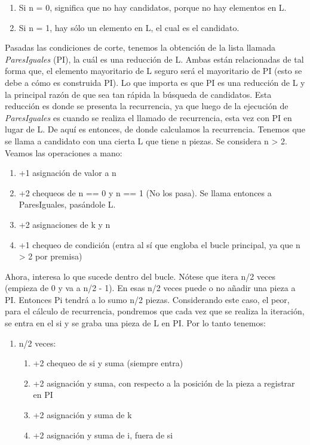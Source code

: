 \documentclass{article}
\begin{document}
\begin{enumerate}
    \item Si n = 0, significa que no hay candidatos, porque no hay elementos en L.
    \item Si n = 1, hay sólo un elemento en L, el cual es el candidato.
\end{enumerate}

Pasadas las condiciones de corte, tenemos la obtención de la lista llamada \textit{ParesIguales} (PI), 
la cuál es una reducción de L. Ambas están relacionadas de tal forma que, 
el elemento mayoritario de L seguro será el mayoritario de PI (esto se debe a cómo es construida PI). 
Lo que importa es que PI es una reducción de L y la principal razón de que sea tan rápida la 
búsqueda de candidatos.
Esta reducción es donde se presenta la recurrencia, ya que luego de la ejecución de \textit{ParesIguales} 
es cuando se realiza el llamado de recurrencia, esta vez con PI en lugar de L. 
De aquí es entonces, de donde calculamos la recurrencia.
Tenemos que se llama a candidato con una cierta L que tiene n piezas. Se considera n > 2. 
Veamos las operaciones a mano:

\begin{enumerate}
    \item +1 asignación de valor a n
    \item +2 chequeos de n == 0 y n == 1 (No los pasa). Se llama entonces a ParesIguales, pasándole L.
    \item +2 asignaciones de k y n
    \item +1 chequeo de condición (entra al sí que engloba el bucle principal, ya que n > 2 por premisa)    
\end{enumerate}

Ahora, interesa lo que sucede dentro del bucle. Nótese que itera n/2 veces (empieza de 0 y va a n/2 - 1). 
En esas n/2 veces puede o no añadir una pieza a PI. 
Entonces Pi tendrá a lo sumo n/2 piezas. 
Considerando este caso, el peor, para el cálculo de recurrencia, 
pondremos que cada vez que se realiza la iteración, 
se entra en el si y se graba una pieza de L en PI. Por lo tanto tenemos:

\begin{enumerate}
    \item n/2 veces:
    \begin{enumerate}
        \item +2 chequeo de si y suma (siempre entra)
        \item +2 asignación y suma, con respecto a la posición de la pieza a registrar en PI
        \item +2 asignación y suma de k
        \item +2 asignación y suma de i, fuera de si
    \end{enumerate}
\end{enumerate}
\end{document}
